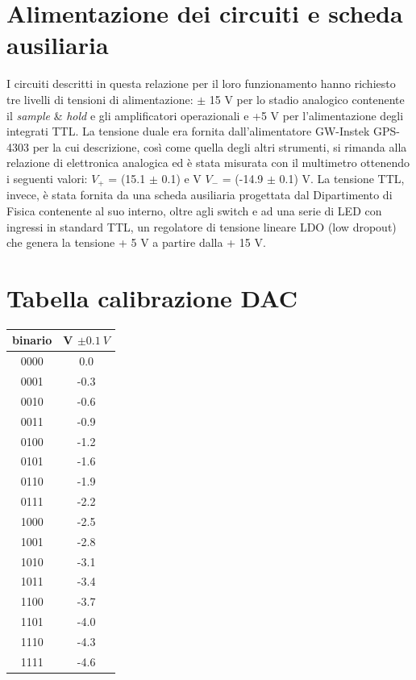 \documentclass[journal]{IEEEtran}
\begin{document}
\begin{appendices}
\section{Alimentazione dei circuiti e scheda ausiliaria}
I circuiti descritti in questa relazione per il loro funzionamento hanno richiesto tre livelli di tensioni di alimentazione: $\pm$ 15 V per lo stadio analogico contenente il \textit{sample} \& \textit{hold} e gli amplificatori operazionali e +5 V per l'alimentazione degli integrati TTL. La tensione duale era fornita dall'alimentatore GW-Instek GPS-4303 per la cui descrizione, così come quella degli altri strumenti, si rimanda alla relazione di elettronica analogica ed è stata misurata con il multimetro ottenendo i seguenti valori: $V_+$ = (15.1 $\pm$ 0.1) e V $V_-$ = (-14.9 $\pm$ 0.1) V. La tensione TTL, invece, è stata fornita da una scheda ausiliaria progettata dal Dipartimento di Fisica contenente al suo interno, oltre agli switch e ad una serie di LED con ingressi in standard TTL, un regolatore di tensione lineare LDO (low dropout) che genera la tensione + 5 V a partire dalla + 15 V.

\section{Tabella calibrazione DAC}

\centering
\begin{tabular}{cc}
binario & V $ \pm 0.1 \ V $ \\ \hline
0000    & 0.0                          \\
0001    & -0.3                       \\
0010    & -0.6                       \\
0011    & -0.9                       \\
0100    & -1.2                       \\
0101    & -1.6                       \\
0110    & -1.9                       \\
0111    & -2.2                       \\
1000    & -2.5                       \\
1001    & -2.8                       \\
1010    & -3.1                       \\
1011    & -3.4                       \\
1100    & -3.7                       \\
1101    & -4.0                       \\
1110    & -4.3                       \\
1111    & -4.6
\vspace{5 mm}
\label{tab:calibrazione_dac}
\end{tabular}



\end{appendices}
\end{document}
